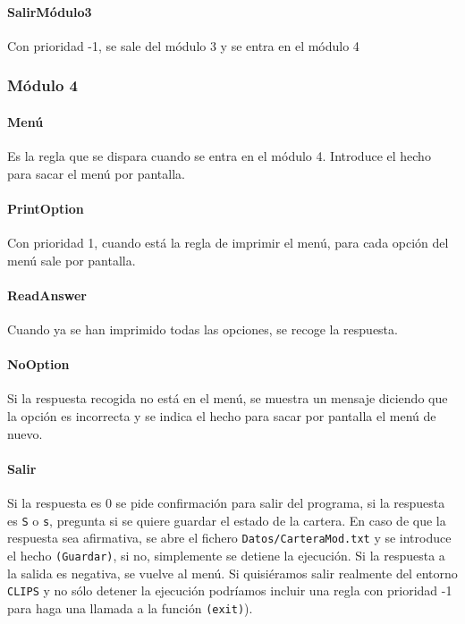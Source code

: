 \documentclass[11pt,leqno]{article}
\theoremstyle{definition_wo_parentheses}
\theoremstyle{plain}
\theoremstyle{remark}
\begin{document}
\paragraph{SalirMódulo3} Con prioridad -1, se sale del módulo 3 y se entra en el módulo 4

\subsubsection{Módulo 4}

\paragraph{Menú} Es la regla que se dispara cuando se entra en el módulo 4. Introduce el hecho para sacar el menú por pantalla. 

\paragraph{PrintOption} Con prioridad 1, cuando está la regla de imprimir el menú, para cada opción del menú sale por pantalla.

\paragraph{ReadAnswer} Cuando ya se han imprimido todas las opciones, se recoge la respuesta. 

\paragraph{NoOption} Si la respuesta recogida no está en el menú, se muestra un mensaje diciendo que la opción es incorrecta y se indica el hecho para sacar por pantalla el menú de nuevo.

\paragraph{Salir} Si la respuesta es 0 se pide confirmación para salir del programa, si la respuesta es \texttt{S} o \texttt{s}, pregunta si se quiere guardar el estado de la cartera. En caso de que la respuesta sea afirmativa, se abre el fichero \texttt{Datos/CarteraMod.txt} y se introduce el hecho \texttt{(Guardar)}, si no, simplemente se detiene la ejecución. Si la respuesta a la salida es negativa, se vuelve al menú. Si quisiéramos salir realmente del entorno \texttt{CLIPS} y no sólo detener la ejecución podríamos incluir una regla con prioridad -1 para haga una llamada a la función \texttt{(exit)}).
\end{document}
